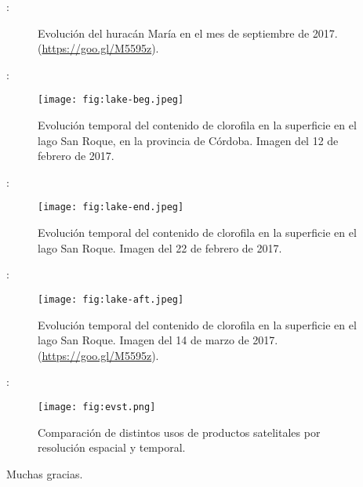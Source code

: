 \begin{frame}{\secname : \subsecname}
    \begin{figure}[h!]
    \centering
    \caption{Evolución del huracán María en el mes de septiembre de 2017. (\href{https://goo.gl/M5595z}{https://goo.gl/M5595z}).}
    \end{figure}
\end{frame} 


\begin{frame}{\secname : \subsecname}
    \begin{figure}[h!]
        \centering
        \texttt{[image: fig:lake-beg.jpeg]}
        \caption{Evolución temporal del contenido de clorofila en la superficie en el lago San Roque, en la provincia de Córdoba. Imagen del 12 de febrero de 2017.}
        \label{fig:lake-beg}
    \end{figure}
\end{frame}

\begin{frame}{\secname : \subsecname}
    \begin{figure}[h!]
        \centering
        \texttt{[image: fig:lake-end.jpeg]}
        \caption{Evolución temporal del contenido de clorofila en la superficie en el lago San Roque. Imagen del 22 de febrero de 2017.}
        \label{fig:lake-end}
    \end{figure}
\end{frame}

\begin{frame}{\secname : \subsecname}
    \begin{figure}[h!]
        \centering
        \texttt{[image: fig:lake-aft.jpeg]}
        \caption{Evolución temporal del contenido de clorofila en la superficie en el lago San Roque. Imagen del 14 de marzo de 2017. (\href{https://goo.gl/M5595z}{https://goo.gl/M5595z}).}
        \label{fig:lake-aft}
    \end{figure}
\end{frame}


\begin{frame}{\secname : \subsecname}
    \begin{figure}[h!]
        \centering
        \texttt{[image: fig:evst.png]}
        \caption{Comparación de distintos usos de productos satelitales por resolución espacial y temporal.}
        \label{fig:evst}
    \end{figure}
\end{frame}

\begin{frame}{\secname}
Muchas gracias.
\end{frame}
